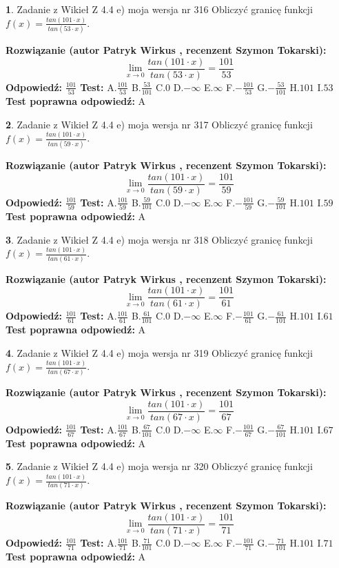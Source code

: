 \documentclass[12pt, a4paper]{article}
\theoremstyle{definition} %
\newtheorem{zad}{}
\newcommand{\zadStart}[1]{\begin{zad}#1\newline}
\newcommand{\zadStop}{\end{zad}}
\newcommand{\rozwStart}[2]{\noindent \textbf{Rozwiązanie (autor #1 , recenzent #2): }\newline}
\newcommand{\rozwStop}{\newline}
\newcommand{\odpStart}{\noindent \textbf{Odpowiedź:}\newline}
\newcommand{\odpStop}{\newline}
\newcommand{\testStart}{\noindent \textbf{Test:}\newline}
\newcommand{\testStop}{\newline}
\newcommand{\kluczStart}{\noindent \textbf{Test poprawna odpowiedź:}\newline}
\newcommand{\kluczStop}{\newline}
\begin{document}
\zadStart{Zadanie z Wikieł Z 4.4 e) moja wersja nr 316}
Obliczyć granicę funkcji $f(x)=\frac{tan(101\cdot x)}{tan(53\cdot x)}$.
\zadStop
\rozwStart{Patryk Wirkus}{Szymon Tokarski}
$$\lim\limits_{x\to 0}\frac{tan(101\cdot x)}{tan(53\cdot x)}=
\frac{101}{53}$$
\rozwStop
\odpStart
$\frac{101}{53}$
\odpStop
\testStart
A.$\frac{101}{53}$
B.$\frac{53}{101}$
C.$0$
D.$-\infty$
E.$\infty$
F.$-\frac{101}{53}$
G.$-\frac{53}{101}$
H.$101$
I.$53$
\testStop
\kluczStart
A
\kluczStop



\zadStart{Zadanie z Wikieł Z 4.4 e) moja wersja nr 317}
Obliczyć granicę funkcji $f(x)=\frac{tan(101\cdot x)}{tan(59\cdot x)}$.
\zadStop
\rozwStart{Patryk Wirkus}{Szymon Tokarski}
$$\lim\limits_{x\to 0}\frac{tan(101\cdot x)}{tan(59\cdot x)}=
\frac{101}{59}$$
\rozwStop
\odpStart
$\frac{101}{59}$
\odpStop
\testStart
A.$\frac{101}{59}$
B.$\frac{59}{101}$
C.$0$
D.$-\infty$
E.$\infty$
F.$-\frac{101}{59}$
G.$-\frac{59}{101}$
H.$101$
I.$59$
\testStop
\kluczStart
A
\kluczStop



\zadStart{Zadanie z Wikieł Z 4.4 e) moja wersja nr 318}
Obliczyć granicę funkcji $f(x)=\frac{tan(101\cdot x)}{tan(61\cdot x)}$.
\zadStop
\rozwStart{Patryk Wirkus}{Szymon Tokarski}
$$\lim\limits_{x\to 0}\frac{tan(101\cdot x)}{tan(61\cdot x)}=
\frac{101}{61}$$
\rozwStop
\odpStart
$\frac{101}{61}$
\odpStop
\testStart
A.$\frac{101}{61}$
B.$\frac{61}{101}$
C.$0$
D.$-\infty$
E.$\infty$
F.$-\frac{101}{61}$
G.$-\frac{61}{101}$
H.$101$
I.$61$
\testStop
\kluczStart
A
\kluczStop



\zadStart{Zadanie z Wikieł Z 4.4 e) moja wersja nr 319}
Obliczyć granicę funkcji $f(x)=\frac{tan(101\cdot x)}{tan(67\cdot x)}$.
\zadStop
\rozwStart{Patryk Wirkus}{Szymon Tokarski}
$$\lim\limits_{x\to 0}\frac{tan(101\cdot x)}{tan(67\cdot x)}=
\frac{101}{67}$$
\rozwStop
\odpStart
$\frac{101}{67}$
\odpStop
\testStart
A.$\frac{101}{67}$
B.$\frac{67}{101}$
C.$0$
D.$-\infty$
E.$\infty$
F.$-\frac{101}{67}$
G.$-\frac{67}{101}$
H.$101$
I.$67$
\testStop
\kluczStart
A
\kluczStop



\zadStart{Zadanie z Wikieł Z 4.4 e) moja wersja nr 320}
Obliczyć granicę funkcji $f(x)=\frac{tan(101\cdot x)}{tan(71\cdot x)}$.
\zadStop
\rozwStart{Patryk Wirkus}{Szymon Tokarski}
$$\lim\limits_{x\to 0}\frac{tan(101\cdot x)}{tan(71\cdot x)}=
\frac{101}{71}$$
\rozwStop
\odpStart
$\frac{101}{71}$
\odpStop
\testStart
A.$\frac{101}{71}$
B.$\frac{71}{101}$
C.$0$
D.$-\infty$
E.$\infty$
F.$-\frac{101}{71}$
G.$-\frac{71}{101}$
H.$101$
I.$71$
\testStop
\kluczStart
A
\kluczStop
\end{document}
